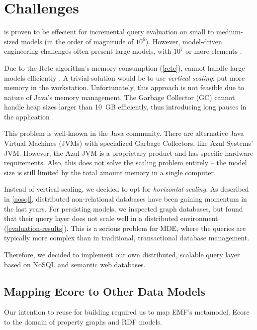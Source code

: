 \section{Challenges}

\eiq{} is proven to be effecient for incremental query evaluation on small to medium-sized models (in the order of magnitude of $10^6$). However, model-driven engineering challenges often present large models, with $10^7$ or more elements \cite{Scheidgen12}. 

Due to the Rete algorithm's memory consumption (\autoref{rete}), \eiq{} cannot handle large models efficiently \cite{models10}. A trivial solution would be to use \emph{vertical scaling}: put more memory in the workstation. Unfortunately, this approach is not feasible due to nature of Java's memory management. The Garbage Collector (GC) cannot handle heap sizes larger than 10~GB efficiently, thus introducing long pauses in the application \cite{Azul}. 

This problem is well-known in the Java community. There are alternative Java Virtual Machines (JVMs) with specialized Garbage Collectors, like Azul Systems' JVM. However, the Azul JVM is a proprietary product and has specific hardware requirements. Also, this does not solve the scaling problem entirely -- the model size is still limited by the total amount memory in a single computer.

Instead of vertical scaling, we decided to opt for \emph{horizontal scaling}. As described in \autoref{nosql}, distributed non-relational databases have been gaining momentum in the last years. For persisting models, we inspected graph databases, but found that their query layer does not scale well in a distributed environment (\autoref{evaluation-results}). This is a serious problem for MDE, where the queries are typically more complex than in traditional, transactional database management.

Therefore, we decided to implement our own distributed, scalable query layer based on NoSQL and semantic web databases.


 

\subsection{Mapping Ecore to Other Data Models}
\label{ecore-mapping}

Our intention to reuse \eiq{} for building \iqd{} required us to map EMF's metamodel, Ecore to the domain of property graphs and RDF models.

